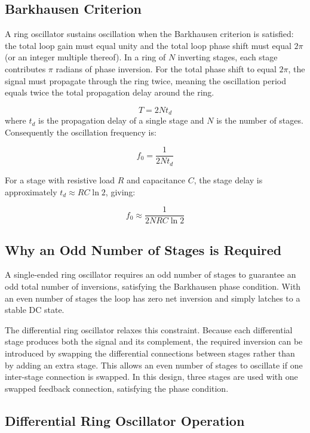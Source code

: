 \documentclass[11pt]{article}
\begin{document}
\subsection{Barkhausen Criterion}
A ring oscillator sustains oscillation when the Barkhausen criterion is satisfied:
the total loop gain must equal unity and the total loop phase shift must equal
$2\pi$ (or an integer multiple thereof). In a ring of $N$ inverting stages, each
stage contributes $\pi$ radians of phase inversion. For the total phase shift to
equal $2\pi$, the signal must propagate through the ring twice, meaning the
oscillation period equals twice the total propagation delay around the ring.

\begin{equation}
T = 2Nt_{d}
\end{equation}
where $t_d$ is the propagation delay of a single stage and $N$ is the number of
stages. Consequently the oscillation frequency is:


\[
f_0 = \frac{1}{2N t_d}
\tag{2}
\]


For a stage with resistive load $R$ and capacitance $C$, the stage delay is
approximately $t_d \approx RC \ln 2$, giving:


\[
f_0 \approx \frac{1}{2N RC \ln 2}
\]

\subsection{Why an Odd Number of Stages is Required}

A single-ended ring oscillator requires an odd number of stages to guarantee an
odd total number of inversions, satisfying the Barkhausen phase condition. With
an even number of stages the loop has zero net inversion and simply latches to a
stable DC state.

The differential ring oscillator relaxes this constraint. Because each differential
stage produces both the signal and its complement, the required inversion can be
introduced by swapping the differential connections between stages rather than by
adding an extra stage. This allows an even number of stages to oscillate if one
inter-stage connection is swapped. In this design, three stages are used with one
swapped feedback connection, satisfying the phase condition.



\subsection{Differential Ring Oscillator Operation}
\end{document}
